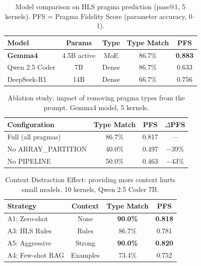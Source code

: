 \begin{table}[t]
\centering
\caption{Model comparison on HLS pragma prediction (pass@1, 5 kernels).
PFS = Pragma Fidelity Score (parameter accuracy, 0--1).}
\label{tab:models}
\begin{tabular}{lcccc}
\toprule
\textbf{Model} & \textbf{Params} & \textbf{Type} & \textbf{Type Match} & \textbf{PFS} \\
\midrule
\textbf{Gemma4}    & 4.5B active & MoE   & 86.7\% & \textbf{0.883} \\
Qwen 2.5 Coder     & 7B          & Dense & 86.7\% & 0.633 \\
DeepSeek-R1         & 14B         & Dense & 66.7\% & 0.756 \\
\bottomrule
\end{tabular}
\end{table}

\begin{table}[t]
\centering
\caption{Ablation study: impact of removing pragma types from the prompt.
Gemma4 model, 5 kernels.}
\label{tab:ablation}
\begin{tabular}{lccc}
\toprule
\textbf{Configuration} & \textbf{Type Match} & \textbf{PFS} & \textbf{$\Delta$PFS} \\
\midrule
Full (all pragmas)      & 86.7\% & 0.817 & --- \\
No ARRAY\_PARTITION     & 40.0\% & 0.497 & $-$39\% \\
No PIPELINE             & 50.0\% & 0.463 & $-$43\% \\
\bottomrule
\end{tabular}
\end{table}

\begin{table}[t]
\centering
\caption{Context Distraction Effect: providing more context hurts small models.
10 kernels, Qwen 2.5 Coder 7B.}
\label{tab:distraction}
\begin{tabular}{lccc}
\toprule
\textbf{Strategy} & \textbf{Context} & \textbf{Type Match} & \textbf{PFS} \\
\midrule
A1: Zero-shot       & None     & \textbf{90.0\%} & \textbf{0.818} \\
A3: HLS Rules       & Rules    & 86.7\% & 0.781 \\
A5: Aggressive       & Strong   & \textbf{90.0\%} & \textbf{0.820} \\
A4: Few-shot RAG     & Examples & 73.4\% & 0.752 \\
\bottomrule
\end{tabular}
\end{table}

